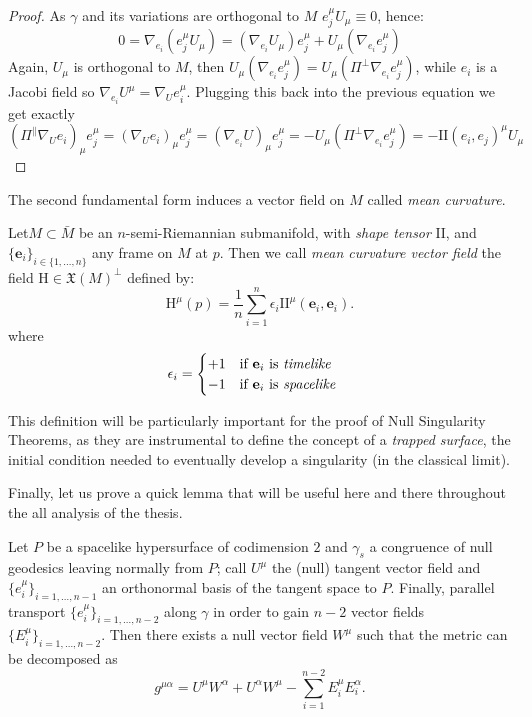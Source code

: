 	\begin{proof}
		As \(\gamma\) and its variations are orthogonal to \(M\) \(e_j^{\mu}U_{\mu} \equiv 0\), hence:
		\[
		0 = \nabla_{e_i}\left(e_j^{\mu}U_{\mu}\right) = \left(\nabla_{e_i}U_{\mu}\right)e_j^{\mu} + U_{\mu}\left(\nabla_{e_i}e_j^{\mu}\right)
		\]
		Again, \(U_{\mu}\) is orthogonal to \(M\), then \(U_{\mu}  \left(\nabla_{e_i}e_j^{\mu}\right)= U_{\mu}\left(\Pi^{\perp}\nabla_{e_i}e_j^{\mu}\right)\), while \(e_i\) is a Jacobi field so \(\nabla_{e_i}U^{\mu} = \nabla_Ue_i^{\mu}\). Plugging this back into the previous equation we get exactly
		\[
		(\Pi^{\parallel}\nabla_Ue_i)_{\mu}e_j^{\mu} = (\nabla_Ue_i)_{\mu}e_j^{\mu} = (\nabla_{e_i}U)_{\mu} e_j^{\mu} = - U_{\mu}\left(\Pi^{\perp}\nabla_{e_i}e_j^{\mu}\right) = - \mathrm{I\!I}(e_i, e_j)^{\mu}U_{\mu}
		\]
	\end{proof}


The second fundamental form induces a vector field on \(M\) called \emph{mean curvature}.


\begin{definition}
		Let\(M \subset \bar{M}\) be an  \(n\)-semi-Riemannian submanifold, with \emph{shape tensor} \(\mathrm{I\!I}\), and \(\{\textbf{e}_i\}_{i \in \{1, \ldots, n\}}\) any frame on \(M\) at \(p\). Then we call \emph{mean curvature vector field} the field \(\mathrm{H} \in \mathfrak{X}(M)^{\perp} \) defined by:
		\[
		\mathrm{H}^{\mu}(p) = \frac{1}{n} \sum_{i=1}^{n} \epsilon_i \mathrm{I\!I}^{\mu}(\textbf{e}_i, \textbf{e}_i).
		\]
		where 
		\[
		\epsilon_i = 
		\begin{cases}
		+1 \quad \text{if } \textbf{e}_i \text{ is \emph{timelike}} \\
		-1 \quad \text{if } \textbf{e}_i \text{ is \emph{spacelike}}
		\end{cases}
		\]
\end{definition}

This definition will be particularly important for the proof of Null Singularity Theorems, as they are instrumental to define the concept of a \emph{trapped surface}, the initial condition needed to eventually develop a singularity (in the classical limit). 

Finally, let us prove a quick lemma that will be useful here and there throughout the all analysis of the thesis.
\begin{lemma}
	\label{lemma:metric-decomposition}
	Let \(P\) be a spacelike hypersurface of codimension \(2\) and \(\gamma_s\) a congruence of null geodesics leaving normally from \(P\); call \(U^{\mu}\) the (null) tangent vector field and \(\{e_i^{\mu}\}_{i = 1, \ldots, n - 1}\) an orthonormal basis of the tangent space to \(P\). Finally, parallel transport \(\{e_i^{\mu}\}_{i = 1, \ldots, n - 2}\) along \(\gamma\) in order to gain \(n - 2\) vector fields \(\{E_i^{\mu}\}_{i = 1, \ldots, n - 2}\). Then there exists a null vector field \(W^{\mu}\) such that the metric can be decomposed as
	\begin{equation}
		g^{\mu\alpha} = U^{\mu}W^{\alpha} + U^{\alpha}W^{\mu} - \sum_{i=1}^{n - 2}E_i^{\mu}E_i^{\alpha}.
	\end{equation}
\end{lemma}


